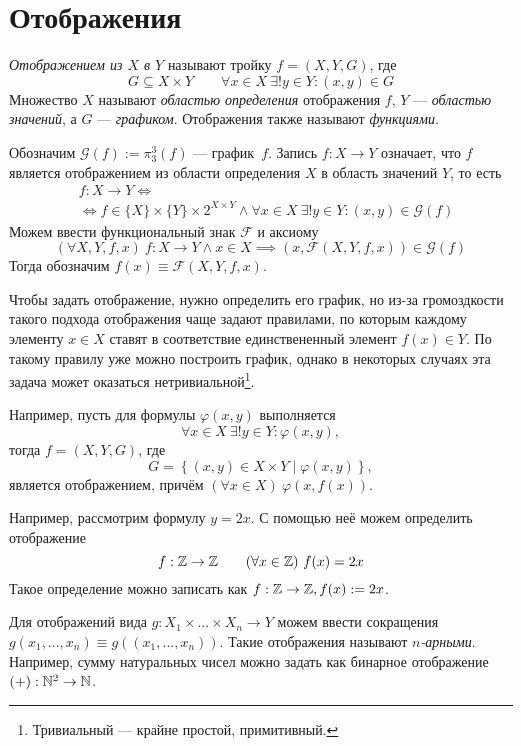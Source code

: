 \section{Отображения}

\newcommand\G{\mathcal G}
{\it Отображением из $X$ в $Y$} называют тройку $f=(X,Y,G)$, где
\[
  G\subseteq X\times Y\qquad
  \forall x\in X~\exists! y\in Y:(x,y)\in G
\]
Множество $X$ называют {\it областью определения} отображения $f$,
$Y$ --- {\it областью значений}, а $G$ --- {\it графиком}.
Отображения также называют {\it функциями}.

Обозначим $\G(f):=\pi_{3}^{3}(f)$ --- график~$f$.
Запись ${f:X\to Y}$ означает, что $f$ является отображением из
области определения $X$ в область значений $Y$, то есть
\[
  \begin{aligned}
     & f:X\to Y\iff \\
     & \iff
    f\in \{X\}\times \{Y\}\times 2^{X\times Y}\land
    \forall x\in X~\exists !y\in Y:(x,y)\in \G(f)
  \end{aligned}
\]
Можем ввести функциональный знак $\mathcal F$ и аксиому
\[
  (\forall X,Y,f,x)~f:X\to Y\land x\in X\implies
  (x,\mathcal F(X,Y,f,x))\in \G(f)
\]
Тогда обозначим $f(x)\equiv \mathcal F(X,Y,f,x)$.

Чтобы задать отображение, нужно определить его график, но
из-за громоздкости такого подхода отображения чаще задают правилами,
по которым каждому элементу $x\in X$
ставят в соответствие единствененный элемент $f(x)\in Y$.
По такому правилу уже можно
построить график, однако в некоторых случаях
эта задача может оказаться нетривиальной\footnote{
  Тривиальный --- крайне простой, примитивный.}.

Например, пусть для формулы $\varphi(x,y)$ выполняется
\[
  \forall x\in X~\exists !y\in Y:\varphi(x,y),
\]
тогда $f=(X,Y,G)$, где
\[
  G=\left\{(x,y)\in X\times Y\;\big|\; \varphi(x,y)\right\},
\]
является отображением, причём $(\forall x\in X)~\varphi(x,f(x))$.

Например, рассмотрим формулу ${y=2x}$.
С помощью неё можем определить отображение
\[
  f:\mathbb Z\to\mathbb Z\qquad (\forall x\in\mathbb Z)~f(x)=2x
\]
Такое определение можно записать как $f:\mathbb Z\to\mathbb Z,f(x):=2x$.

Для отображений вида ${g:X_1\times ...\times X_{n}\to Y}$
можем ввести сокращения $g(x_1,...,x_{n})\equiv g((x_1,...,x_{n}))$.
Такие отображения называют {\it \mbox{$n$-арными}}.
Например, сумму натуральных чисел можно
задать как бинарное отображение $(+):\mathbb N^{2}\to\mathbb N$.

